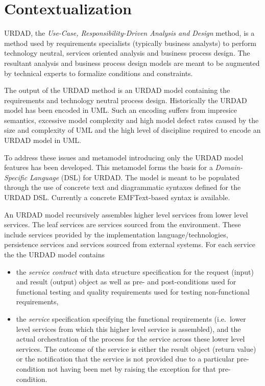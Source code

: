 \section{Contextualization}

URDAD, the {\em Use-Case, Responsibility-Driven Analysis and Design} \cite{solms_urdad_2010, solms_generating_2009, solms_technology_2007} method, is a method used by requirements specialists (typically business analysts) to perform technology neutral, services oriented analysis and business process design. The resultant analysis and business process design models are meant to be augmented by technical experts to formalize conditions and constraints.

The output of the URDAD method is an URDAD model containing the requirements and technology neutral process design. Historically the URDAD model has been encoded in UML. Such an encoding suffers from impresice semantics, excessive model complexity and high model defect rates caused by the size and complexity of UML and the high level of discipline required to encode an URDAD model in UML.

To address these issues and metamodel introducing only the URDAD model features has been developed. This metamodel forms the basis for a {\em Domain-Specific Language} (DSL) for URDAD.  The model is meant to be populated through the use of concrete text and diagrammatic syntaxes defined for the URDAD DSL. Currently a concrete EMFText-based syntax is available.

An URDAD model recursively assembles higher level services from lower level services. The leaf services are services sourced from the environment. These include services provided by the implementation language/technologies, persistence services and services sourced from external systems. For each service the the URDAD model contains
\begin{itemize}
 \item the \textit{service contract} with data structure specification for the request (input) and result (output) object as well as pre- and post-conditions used for functional testing and quality requirements used for testing non-functional requirements,
 \item the \textit{service} specification specifying the functional requirements (i.e.\ lower level services from which this higher level service is assembled), and the actual orchestration of the process for the service across these lower level services. The outcome of the service is either the result object (return value) or the notification that the service is not provided due to a particular pre-condition not having been met by raising the exception for that pre-condition.
\end{itemize}

